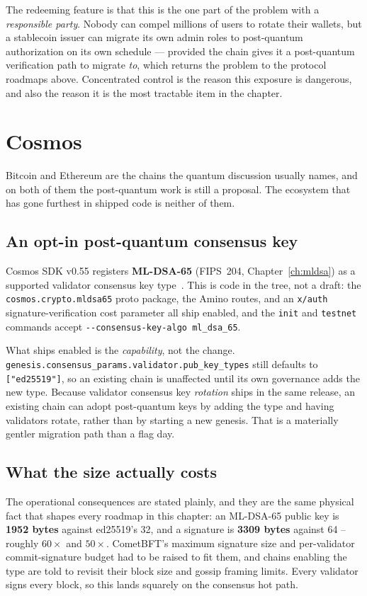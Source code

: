 The redeeming feature is that this is the one part of the problem with a
\emph{responsible party}. Nobody can compel millions of users to rotate their
wallets, but a stablecoin issuer can migrate its own admin roles to post-quantum
authorization on its own schedule --- provided the chain gives it a post-quantum
verification path to migrate \emph{to}, which returns the problem to the protocol
roadmaps above. Concentrated control is the reason this exposure is dangerous,
and also the reason it is the most tractable item in the chapter.

\section{Cosmos}

Bitcoin and Ethereum are the chains the quantum discussion usually names, and on
both of them the post-quantum work is still a proposal. The ecosystem that has
gone furthest in shipped code is neither of them.

\subsection{An opt-in post-quantum consensus key}
Cosmos SDK v0.55 registers \textbf{ML-DSA-65} (FIPS~204, Chapter~\ref{ch:mldsa})
as a supported validator consensus key type~\cite{cosmossdkpq,cosmospqdocs}. This is code in
the tree, not a draft: the \texttt{cosmos.crypto.mldsa65} proto package, the
Amino routes, and an \texttt{x/auth} signature-verification cost parameter all
ship enabled, and the \texttt{init} and \texttt{testnet} commands accept
\texttt{-{}-consensus-key-algo ml\_dsa\_65}.

What ships enabled is the \emph{capability}, not the change.
\texttt{genesis.consensus\_params.validator.pub\_key\_types} still defaults to
\texttt{["ed25519"]}, so an existing chain is unaffected until its own
governance adds the new type. Because validator consensus key \emph{rotation}
ships in the same release, an existing chain can adopt post-quantum keys by
adding the type and having validators rotate, rather than by starting a new
genesis. That is a materially gentler migration path than a flag day.

\subsection{What the size actually costs}
The operational consequences are stated plainly, and they are the same physical
fact that shapes every roadmap in this chapter: an ML-DSA-65 public key is
\textbf{1952 bytes} against ed25519's 32, and a signature is \textbf{3309 bytes}
against 64 -- roughly $60\times$ and $50\times$. CometBFT's maximum signature
size and per-validator commit-signature budget had to be raised to fit them, and
chains enabling the type are told to revisit their block size and gossip framing
limits. Every validator signs every block, so this lands squarely on the
consensus hot path.

